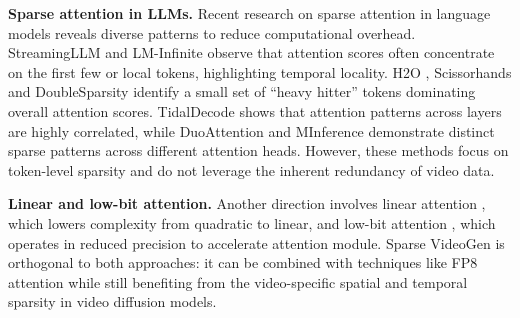 
\noindent\textbf{Sparse attention in LLMs.}
Recent research on sparse attention in language models reveals diverse patterns to reduce computational overhead. StreamingLLM \cite{xiao2023efficient} and LM-Infinite \cite{han2023lm} observe that attention scores often concentrate on the first few or local tokens, highlighting temporal locality. H2O \cite{zhang2023h2o}, Scissorhands \cite{liu2024scissorhands} and DoubleSparsity \cite{yang2024posttrainingsparseattentiondouble} identify a small set of ``heavy hitter'' tokens dominating overall attention scores. TidalDecode \cite{yang2024tidaldecode} shows that attention patterns across layers are highly correlated, while DuoAttention \cite{xiao2024duoattention} and MInference \cite{jiang2024minference} demonstrate distinct sparse patterns across different attention heads. However, these methods focus on token-level sparsity and do not leverage the inherent redundancy of video data.

\noindent\textbf{Linear and low-bit attention.}
Another direction involves linear attention \cite{cai2023efficientvit,xie2024sana,wang2020linformer,choromanski2020rethinking,yu2022metaformer,katharopoulos2020transformers}, which lowers complexity from quadratic to linear, and low-bit attention \cite{zhang2025sageattention,zhang2024sageattention2}, which operates in reduced precision to accelerate attention module. Sparse VideoGen is orthogonal to both approaches: it can be combined with techniques like FP8 attention while still benefiting from the video-specific spatial and temporal sparsity in video diffusion models.


